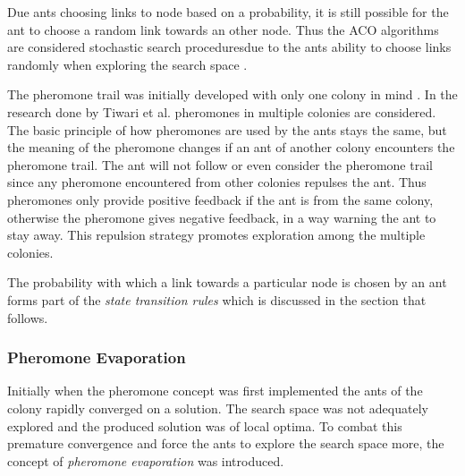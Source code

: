 Due ants choosing links to node based on a probability, it is still possible for the ant to choose a random link towards an other node. Thus the ACO algorithms are considered stochastic search proceduresdue to the ants ability to choose links randomly when exploring the search space \cite{ACOSurvey,ImpACOComplex}.

The pheromone trail was initially developed with only one colony in mind \cite{CompuIntelligenceIntro}. In the research done by Tiwari et al.\cite{ACOLargeProblem} pheromones in multiple colonies are considered. The basic principle of how pheromones are used by the ants stays the same, but the meaning of the pheromone changes if an ant of another colony encounters the pheromone trail\cite{AntQAP,AntsAndStigmergy,CompuIntelligenceIntro}. The ant will not follow or even consider the pheromone trail since any pheromone encountered from other colonies repulses the ant\cite{ACOLargeProblem}. Thus pheromones only provide positive feedback if the ant is from the same colony, otherwise the pheromone gives negative feedback, in a way warning the ant to stay away\cite{ACOLargeProblem}. This repulsion strategy promotes exploration among the multiple colonies\cite{ACOLargeProblem}.

The probability with which a link towards a particular node is chosen by an ant forms part of the \emph{state transition rules} which is discussed in the section that follows.

\subsubsection{Pheromone Evaporation}
\label{sec:pheromoneevapuation}
Initially when the pheromone concept was first implemented the ants of the colony rapidly converged on a solution. The search space was not adequately explored and the produced solution was of local optima. To combat this premature convergence and force the ants to explore the search space more, the concept of \emph{pheromone evaporation} was introduced\cite{CompuIntelligenceIntro,AntsAndStigmergy,AntIntroTrends,AntSurvey}. 

